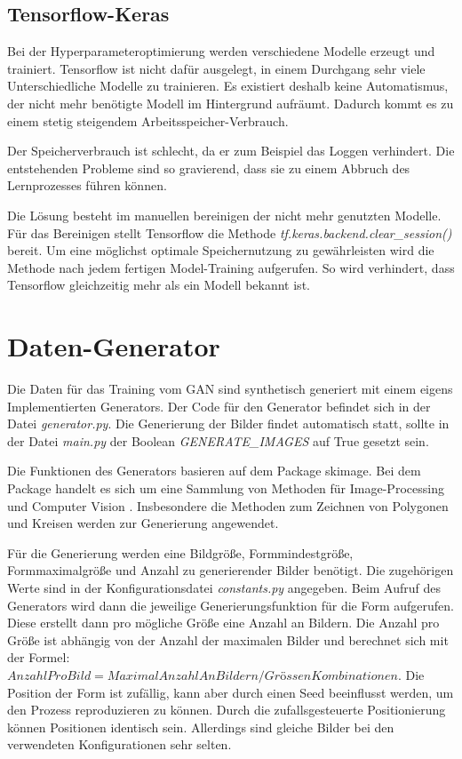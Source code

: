 \subsection{Tensorflow-Keras}
Bei der Hyperparameteroptimierung werden verschiedene Modelle erzeugt und trainiert.
Tensorflow ist nicht dafür ausgelegt, in einem Durchgang sehr viele Unterschiedliche Modelle zu trainieren.
Es existiert deshalb keine Automatismus, der nicht mehr benötigte Modell im Hintergrund aufräumt.
Dadurch kommt es zu einem stetig steigendem Arbeitsspeicher-Verbrauch.

Der Speicherverbrauch ist schlecht, da er zum Beispiel das Loggen verhindert.
Die entstehenden Probleme sind so gravierend, dass sie zu einem Abbruch des Lernprozesses führen können.

Die Lösung besteht im manuellen bereinigen der nicht mehr genutzten Modelle.
Für das Bereinigen stellt Tensorflow die Methode \textit{tf.keras.backend.clear\_session()} bereit.
Um eine möglichst optimale Speichernutzung zu gewährleisten wird die Methode nach jedem fertigen Model-Training aufgerufen.
So wird verhindert, dass Tensorflow gleichzeitig mehr als ein Modell bekannt ist.

\section{Daten-Generator}
Die Daten für das Training vom GAN sind synthetisch generiert mit einem eigens Implementierten Generators.
Der Code für den Generator befindet sich in der Datei \textit{generator.py}.
Die Generierung der Bilder findet automatisch statt, sollte in der Datei \textit{main.py} der Boolean \textit{GENERATE\_IMAGES} auf True gesetzt sein.
\newline

Die Funktionen des Generators basieren auf dem Package skimage.
Bei dem Package handelt es sich um eine Sammlung von Methoden für Image-Processing und Computer Vision .
Insbesondere die Methoden zum Zeichnen von Polygonen und Kreisen werden zur Generierung angewendet.
\newline

Für die Generierung werden eine Bildgröße, Formmindestgröße, Formmaximalgröße und Anzahl zu generierender Bilder benötigt.
Die zugehörigen Werte sind in der Konfigurationsdatei \textit{constants.py} angegeben.
Beim Aufruf des Generators wird dann die jeweilige Generierungsfunktion für die Form aufgerufen.
Diese erstellt dann pro mögliche Größe eine Anzahl an Bildern.
Die Anzahl pro Größe ist abhängig von der Anzahl der maximalen Bilder und berechnet sich mit der Formel: $AnzahlProBild = MaximalAnzahlAnBildern / GrössenKombinationen$.
Die Position der Form ist zufällig, kann aber durch einen Seed beeinflusst werden, um den Prozess reproduzieren zu können.
Durch die zufallsgesteuerte Positionierung können Positionen identisch sein.
Allerdings sind gleiche Bilder bei den verwendeten Konfigurationen sehr selten. 

